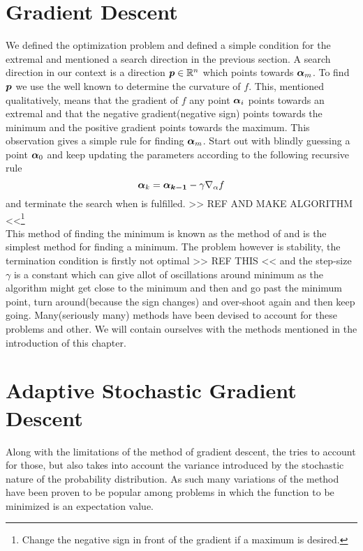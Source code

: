 \section{Gradient Descent\label{sec:gradient_descent}}
    We defined the optimization problem and defined a simple condition for the
    extremal and mentioned a search direction in the previous section. A search
    direction in our context is a direction $\boldsymbol{{p}}\in\mathbb{R}^n$ which
    points towards $\boldsymbol{{\alpha}}_m$. To find $\boldsymbol{{p}}$ we use the well known
     to determine the curvature of $f$. This,
    mentioned qualitatively, means that the gradient of $f$ any point
    $\boldsymbol{{\alpha}}_i$ points towards an extremal and that the negative
    gradient(negative sign) points towards the minimum and the positive
    gradient points towards the maximum. This observation gives a simple rule
    for finding $\boldsymbol{{\alpha}}_m$. Start out with blindly guessing a point
    $\boldsymbol{{\alpha}}_0$ and keep updating the parameters according to the
    following recursive rule
        \begin{equation}
            \boldsymbol{{\alpha}}_k = \boldsymbol{{\alpha_{k-1}}} - \gamma\nabla_{\alpha} f
        \end{equation}
    and terminate the search when  is fulfilled. >>
    REF AND MAKE ALGORITHM <<\footnote{Change the negative sign in front of the
    gradient if a maximum is desired.} \\

    This method of finding the minimum is known as the method of
     and is the simplest method for finding a minimum.
    The problem however is stability, the termination condition is firstly not
    optimal >> REF THIS << and the step-size $\gamma$ is a constant which can
    give allot of oscillations around minimum as the algorithm might get close
    to the minimum and then  and go past the minimum point,
    turn around(because the sign changes) and over-shoot again and then keep
    going. Many(seriously many) methods have been devised to account for these
    problems and other. We will contain ourselves with the methods mentioned in
    the introduction of this chapter.

\section{Adaptive Stochastic Gradient
Descent\label{sec:adaptive_stochastic_gradient_descent}}
    Along with the limitations of the method of gradient descent, the
     tries to account for those,
    but also takes into account the variance introduced by the stochastic
    nature of the probability distribution. As such many variations of the
    method have been proven to be popular among problems in which the function
    to be minimized is an expectation value.

